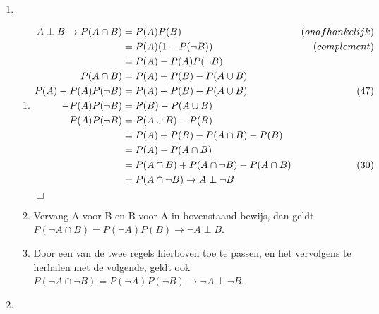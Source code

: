 \documentclass{article}
\begin{document}
\begin{enumerate}
    \item
        \begin{enumerate}
            \item
                \begin{align}
                    A \perp B \to P(A \cap B) &= P(A) P(B) & (onafhankelijk) \notag \\
                                              &= P(A) (1 - P(\lnot B)) & (complement)
                    \notag \\
                                              &= P(A) -P(A)P(\lnot B) \\
                    P(A \cap B) &= P(A) + P(B) - P(A \cup B) \notag \\
                    P(A) - P(A) P(\lnot B) &= P(A) + P(B) - P(A \cup B) & (47) \\
                    -P(A) P(\lnot B) &= P(B) - P(A \cup B) \notag \\
                    P(A) P(\lnot B) &= P(A \cup B) - P(B) \notag \\
                                    &= P(A) + P(B) - P(A \cap B) - P(B) \notag \\
                                    &= P(A) - P(A \cap B) \notag \\
                                    &= P(A \cap B) + P(A \cap \lnot B) - P(A \cap B)
                    & (30) \notag \\
                    &= P(A \cap \lnot B) \to A \perp \lnot B
                \end{align}
                $\Box$

            \item
                Vervang A voor B en B voor A in bovenstaand bewijs, dan geldt
                $P(\lnot A \cap B) = P(\lnot A) P(B) \to \lnot A \perp B$.

            \item
                Door een van de twee regels hierboven toe te passen, en het
                vervolgens te herhalen met de volgende, geldt ook $P(\lnot A
                \cap \lnot B) = P(\lnot A) P(\lnot B) \to \lnot A \perp \lnot
                B$.

        \end{enumerate}

    \item
        \newcommand{\kw}{\mathrm{w}}
        \newcommand{\kr}{\mathrm{r}}
        \newcommand{\I}{\mathrm{I}}
        \newcommand{\II}{\mathrm{II}}
        \newcommand{\III}{\mathrm{III}}


\end{enumerate}
\end{document}
